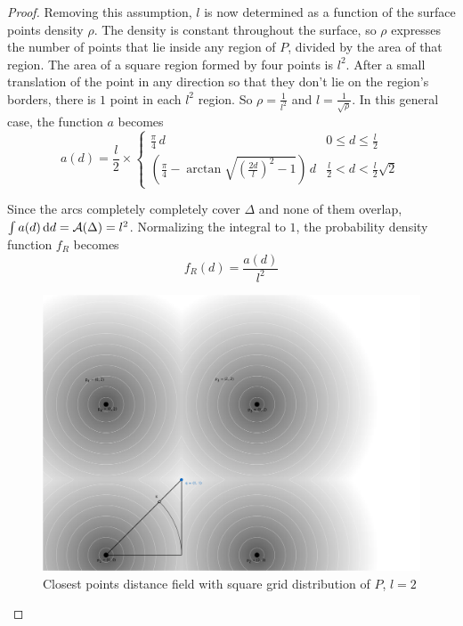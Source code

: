 \begin{proof}
Removing this assumption, $l$ is now determined as a function of the surface points density $\rho$. The density is constant throughout the surface, so $\rho$ expresses the number of points that lie inside any region of $P$, divided by the area of that region. The area of a square region formed by four points is $l^2$. After a small translation of the point in any direction so that they don't lie on the region's borders, there is $1$ point in each $l^2$ region. So $\rho = \frac{1}{l^2}$ and $l = \frac{1}{\sqrt{\rho}}$. In this general case, the function $a$ becomes
\begin{equation}
a(d) = \frac{l}{2} \times \begin{cases}
	\frac{\pi}{4} \, d & 0 \leq d \leq \frac{l}{2} \\
	\left( \frac{\pi}{4} - \arctan{\sqrt{\left( \frac{2d}{l} \right)^2 - 1}} \right) \, d & \frac{l}{2} < d < \frac{l}{2} \sqrt{2}
\end{cases}
\end{equation}

Since the arcs completely completely cover $\Delta$ and none of them overlap, $\int a(d) \, \mathrm{d} d = \mathcal{A}(\Delta) = l^2$. Normalizing the integral to $1$, the probability density function $f_R$ becomes
\begin{equation}
f_R(d) = \frac{a(d)}{l^2}
\end{equation}

\begin{figure}[h]
\centering
\includegraphics[width=.9\textwidth]{fig/sq_grid.pdf}
\caption{Closest points distance field with square grid distribution of $P$, $l = 2$}
\label{fig:sq_grid}
\end{figure}

\end{proof}
